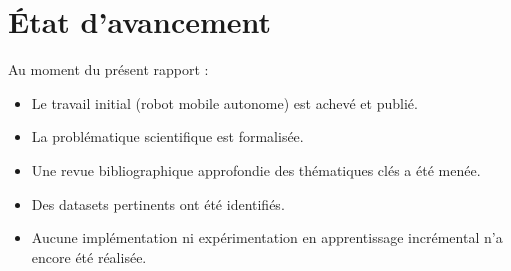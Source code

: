\section{État d’avancement}

Au moment du présent rapport :
\begin{itemize}
    \item Le travail initial (robot mobile autonome) est achevé et publié.
    \item La problématique scientifique est formalisée.
    \item Une revue bibliographique approfondie des thématiques clés a été menée.
    \item Des datasets pertinents ont été identifiés.
    \item Aucune implémentation ni expérimentation en apprentissage incrémental n’a encore été réalisée.
\end{itemize}
